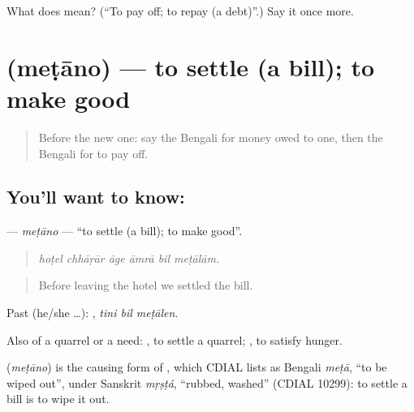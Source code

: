 \begin{tcolorbox}[breakable,colback=teal!4,colframe=teal!35!black,title={Before you move on}]
What does   mean? (\textquotedblleft{}To pay off; to repay (a debt)\textquotedblright{}.) Say it once more.
\end{tcolorbox}
\section[\texorpdfstring{\bn{মেটানো} (meṭāno)}{মেটানো (meṭāno)}]{ (meṭāno) — to settle (a bill); to make good}

\label{lesson:BN-C416-metano}



\begin{quote}
Before the new one: say the Bengali for money owed to one, then the Bengali for to pay off.
\end{quote}

\subsection*{You'll want to know: }
\textbf{} — \emph{meṭāno} — \textquotedblleft{}to settle (a bill); to make good\textquotedblright{}.

\begin{quote}
     
\end{quote}

\begin{quote}
\emph{hoṭel chhāṛār āge āmrā bil meṭālām.}
\end{quote}

\begin{quote}
Before leaving the hotel we settled the bill.
\end{quote}

Past (he/she …):   , \emph{tini bil meṭālen}.

Also of a quarrel or a need:  , to settle a quarrel;  , to satisfy hunger.

\begin{cousinweb}
\textbf{} (\emph{meṭāno}) is the causing form of , which CDIAL lists as Bengali \emph{meṭā}, \textquotedblleft{}to be wiped out\textquotedblright{}, under Sanskrit \emph{mṛṣṭá}, \textquotedblleft{}rubbed, washed\textquotedblright{} (CDIAL 10299): to settle a bill is to wipe it out.
\end{cousinweb}

